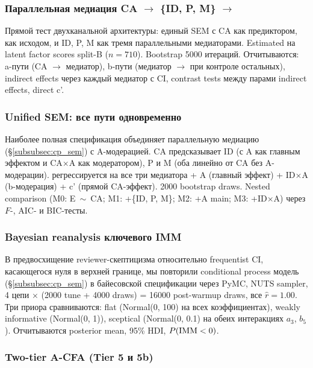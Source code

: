 \subsubsection{\texorpdfstring{Параллельная медиация CA $\to$ \{ID, P, M\} $\to$ \EAF{}}{Параллельная медиация CA -> {ID, P, M} -> E\_AF}}

Прямой тест двухканальной архитектуры: единый SEM с CA как предиктором, \EAF{} как исходом, и ID, P, M как тремя параллельными медиаторами. Estimated на latent factor scores split-B ($n = 710$). Bootstrap 5000 итераций. Отчитываются: a-пути (CA $\to$ медиатор), b-пути (медиатор $\to$ \EAF{} при контроле остальных), indirect effects через каждый медиатор с CI, contrast tests между парами indirect effects, direct c'.

\subsubsection{Unified SEM: все пути одновременно}

Наиболее полная спецификация объединяет параллельную медиацию (§\ref{subsubsec:cp_sem}) с A-модерацией. CA предсказывает ID (с A как главным эффектом и CA$\times$A как модератором), P и M (оба линейно от CA без A-модерации). \EAF{} регрессируется на все три медиатора + A (главный эффект) + ID$\times$A (b-модерация) + c' (прямой CA-эффект). 2000 bootstrap draws. Nested comparison (M0: E~$\sim$~CA; M1: +\{ID, P, M\}; M2: +A main; M3: +ID$\times$A) через $F$-, AIC- и BIC-тесты.

\subsubsection{Bayesian reanalysis ключевого IMM}

В предвосхищение reviewer-скептицизма относительно frequentist CI, касающегося нуля в верхней границе, мы повторили conditional process модель (§\ref{subsubsec:cp_sem}) в байесовской спецификации через PyMC, NUTS sampler, 4 цепи $\times$ (2000 tune + 4000 draws) = 16000 post-warmup draws, все $\hat{r} = 1.00$. Три приора сравниваются: flat (Normal(0, 100) на всех коэффициентах), weakly informative (Normal(0, 1)), sceptical (Normal(0, 0.1) на обеих интеракциях $a_3$, $b_5$). Отчитываются posterior mean, 95\% HDI, $P(\mathrm{IMM} < 0)$.

\subsubsection{Two-tier A-CFA (Tier 5 и 5b)}

